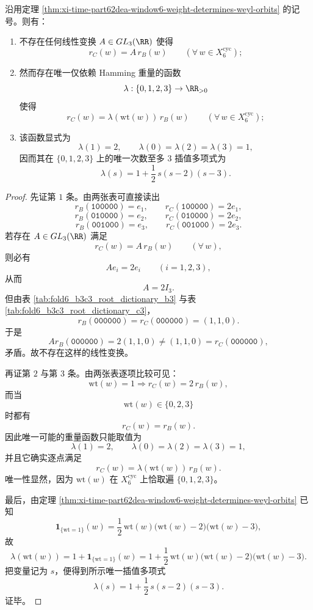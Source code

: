 \begin{theorem}\label{thm:xi-time-part62dea-window6-b3c3-unique-radial-weight-scaling}
沿用定理 \ref{thm:xi-time-part62dea-window6-weight-determines-weyl-orbits} 的记号。则有：
\begin{enumerate}
  \item 不存在任何线性变换 \(A\in GL_3(\RR)\) 使得
  \[
  r_C(w)=A\,r_B(w)
  \qquad(\forall\,w\in X_6^{\mathrm{cyc}});
  \]
  \item 然而存在唯一仅依赖 Hamming 重量的函数
  \[
  \lambda:\{0,1,2,3\}\to \RR_{>0}
  \]
  使得
  \[
  r_C(w)=\lambda(\mathrm{wt}(w))\,r_B(w)
  \qquad(\forall\,w\in X_6^{\mathrm{cyc}});
  \]
  \item 该函数显式为
  \[
  \lambda(1)=2,
  \qquad
  \lambda(0)=\lambda(2)=\lambda(3)=1,
  \]
  因而其在 \(\{0,1,2,3\}\) 上的唯一次数至多 \(3\) 插值多项式为
  \[
  \lambda(s)=1+\frac12\,s(s-2)(s-3).
  \]
\end{enumerate}
\end{theorem}
\begin{proof}
先证第 \(1\) 条。由两张表可直接读出
\[
r_B(\texttt{100000})=e_1,\qquad r_C(\texttt{100000})=2e_1,
\]
\[
r_B(\texttt{010000})=e_2,\qquad r_C(\texttt{010000})=2e_2,
\]
\[
r_B(\texttt{001000})=e_3,\qquad r_C(\texttt{001000})=2e_3.
\]
若存在 \(A\in GL_3(\RR)\) 满足
\[
r_C(w)=A\,r_B(w)\qquad(\forall\,w),
\]
则必有
\[
Ae_i=2e_i\qquad(i=1,2,3),
\]
从而
\[
A=2I_3.
\]
但由表 \ref{tab:fold6_b3c3_root_dictionary_b3} 与表 \ref{tab:fold6_b3c3_root_dictionary_c3}，
\[
r_B(\texttt{000000})=r_C(\texttt{000000})=(1,1,0).
\]
于是
\[
Ar_B(\texttt{000000})
=
2(1,1,0)
\neq
(1,1,0)
=
r_C(\texttt{000000}),
\]
矛盾。故不存在这样的线性变换。

再证第 \(2\) 与第 \(3\) 条。由两张表逐项比较可见：
\[
\mathrm{wt}(w)=1\Longrightarrow r_C(w)=2\,r_B(w),
\]
而当
\[
\mathrm{wt}(w)\in\{0,2,3\}
\]
时都有
\[
r_C(w)=r_B(w).
\]
因此唯一可能的重量函数只能取值为
\[
\lambda(1)=2,
\qquad
\lambda(0)=\lambda(2)=\lambda(3)=1,
\]
并且它确实逐点满足
\[
r_C(w)=\lambda(\mathrm{wt}(w))\,r_B(w).
\]
唯一性显然，因为 \(\mathrm{wt}(w)\) 在 \(X_6^{\mathrm{cyc}}\) 上恰取遍 \(\{0,1,2,3\}\)。

最后，由定理 \ref{thm:xi-time-part62dea-window6-weight-determines-weyl-orbits} 已知
\[
\mathbf 1_{\{\mathrm{wt}=1\}}(w)
=
\frac12\,\mathrm{wt}(w)\bigl(\mathrm{wt}(w)-2\bigr)\bigl(\mathrm{wt}(w)-3\bigr),
\]
故
\[
\lambda(\mathrm{wt}(w))
=
1+\mathbf 1_{\{\mathrm{wt}=1\}}(w)
=
1+\frac12\,\mathrm{wt}(w)\bigl(\mathrm{wt}(w)-2\bigr)\bigl(\mathrm{wt}(w)-3\bigr).
\]
把变量记为 \(s\)，便得到所示唯一插值多项式
\[
\lambda(s)=1+\frac12\,s(s-2)(s-3).
\]
证毕。
\end{proof}

